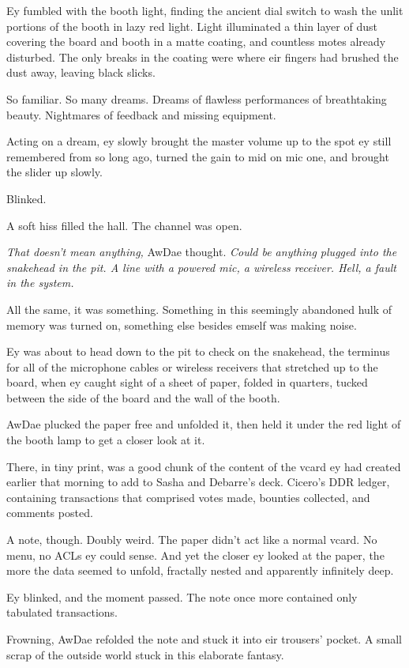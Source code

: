 Ey fumbled with the booth light, finding the ancient dial switch to wash the unlit portions of the booth in lazy red light. Light illuminated a thin layer of dust covering the board and booth in a matte coating, and countless motes already disturbed. The only breaks in the coating were where eir fingers had brushed the dust away, leaving black slicks.

So familiar. So many dreams. Dreams of flawless performances of breathtaking beauty. Nightmares of feedback and missing equipment.

Acting on a dream, ey slowly brought the master volume up to the spot ey still remembered from so long ago, turned the gain to mid on mic one, and brought the slider up slowly.

Blinked.

A soft hiss filled the hall. The channel was open.

\emph{That doesn't mean anything,} AwDae thought. \emph{Could be anything plugged into the snakehead in the pit. A line with a powered mic, a wireless receiver. Hell, a fault in the system.}

All the same, it was something. Something in this seemingly abandoned hulk of memory was turned on, something else besides emself was making noise.

Ey was about to head down to the pit to check on the snakehead, the terminus for all of the microphone cables or wireless receivers that stretched up to the board, when ey caught sight of a sheet of paper, folded in quarters, tucked between the side of the board and the wall of the booth.

AwDae plucked the paper free and unfolded it, then held it under the red light of the booth lamp to get a closer look at it.

There, in tiny print, was a good chunk of the content of the vcard ey had created earlier that morning to add to Sasha and Debarre's deck. Cicero's DDR ledger, containing transactions that comprised votes made, bounties collected, and comments posted.

A note, though. Doubly weird. The paper didn't act like a normal vcard. No menu, no ACLs ey could sense. And yet the closer ey looked at the paper, the more the data seemed to unfold, fractally nested and apparently infinitely deep.

Ey blinked, and the moment passed. The note once more contained only tabulated transactions.

Frowning, AwDae refolded the note and stuck it into eir trousers' pocket. A small scrap of the outside world stuck in this elaborate fantasy.
